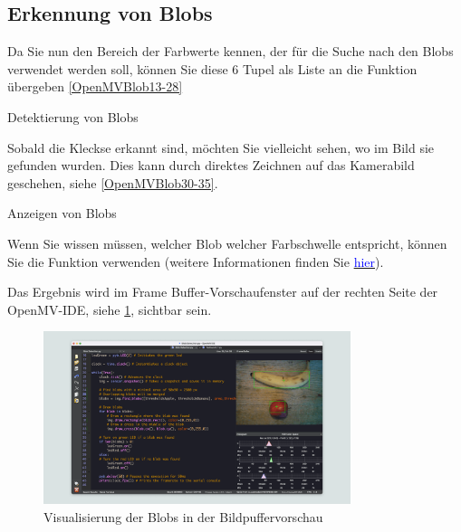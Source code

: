 \subsection{Erkennung von Blobs}

Da Sie nun den Bereich der Farbwerte kennen, der für die Suche nach den Blobs verwendet werden soll, können Sie diese 6 Tupel als Liste an die Funktion  übergeben \ref{OpenMVBlob13-28}

\begin{code}
	

	


	\caption{Detektierung von Blobs}\label{OpenMVBlob13-28}
\end{code}


Sobald die Kleckse erkannt sind, möchten Sie vielleicht sehen, wo im Bild sie gefunden wurden. Dies kann durch direktes Zeichnen auf das Kamerabild geschehen, siehe \ref{OpenMVBlob30-35}.


\begin{code}
	
	
	
	
	\caption{Anzeigen von Blobs}\label{OpenMVBlob30-35}
\end{code}

Wenn Sie wissen müssen, welcher Blob welcher Farbschwelle entspricht, können Sie die Funktion  verwenden (weitere Informationen finden Sie \href{https://docs.openmv.io/library/omv.image.html#image.image.blob.blob.code}{\textcolor{blue}{hier}}).

Das Ergebnis wird im Frame Buffer-Vorschaufenster auf der rechten Seite der OpenMV-IDE, siehe \ref{OpenMVVisu}, sichtbar sein. 


\begin{figure}
	\includegraphics[width=0.8\textwidth]{OpenMV/OpenMVFrame}
	
	\caption{Visualisierung der Blobs in der Bildpuffervorschau}
	\label{OpenMVVisu}
\end{figure}




